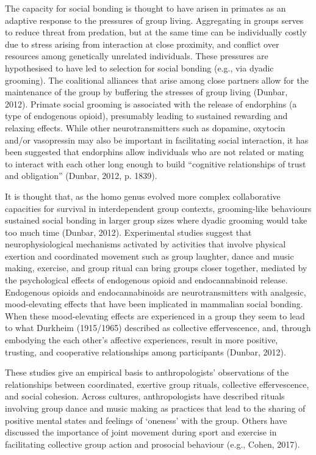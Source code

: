 \documentclass[12pt]{report}
\begin{document}
The capacity for social bonding is thought to have arisen in primates as an adaptive response to the pressures of group living.  Aggregating in groups serves to reduce threat from predation, but at the same time can be individually costly due to stress arising from interaction at close proximity, and conflict over resources among genetically unrelated individuals.  These pressures are hypothesised to have led to selection for social bonding (e.g., via dyadic grooming). The coalitional alliances that arise among close partners allow for the maintenance of the group by buffering the stresses of group living (Dunbar, 2012).  Primate social grooming is associated with the release of endorphins (a type of endogenous opioid), presumably leading to sustained rewarding and relaxing effects.  While other neurotransmitters such as dopamine, oxytocin and/or vasopressin may also be important in facilitating social interaction, it has been suggested that endorphins allow individuals who are not related or mating to interact with each other long enough to build “cognitive relationships of trust and obligation” (Dunbar, 2012, p. 1839).

It is thought that, as the homo genus evolved more complex collaborative capacities for survival in interdependent group contexts, grooming-like behaviours sustained social bonding in larger group sizes where dyadic grooming would take too much time (Dunbar, 2012).  Experimental studies suggest that neurophysiological mechanisms activated by activities that involve physical exertion and coordinated movement such as group laughter, dance and music making, exercise, and group ritual can bring groups closer together, mediated by the psychological effects of endogenous opioid and endocannabinoid release.  Endogenous opioids and endocannabinoids are neurotransmitters with analgesic, mood-elevating effects that have been implicated in mammalian social bonding. When these mood-elevating effects are experienced in a group they seem to lead to what Durkheim (1915/1965) described as collective effervescence, and, through embodying the each other’s affective experiences, result in more positive, trusting, and cooperative relationships among participants (Dunbar, 2012).

These studies give an empirical basis to anthropologists’ observations of the relationships between coordinated, exertive group rituals, collective effervescence, and social cohesion. Across cultures, anthropologists have described rituals involving group dance and music making as practices that lead to the sharing of positive mental states and feelings of ‘oneness’ with the group.  Others have discussed the importance of joint movement during sport and exercise in facilitating collective group action and prosocial behaviour (e.g., Cohen, 2017).
\end{document}
